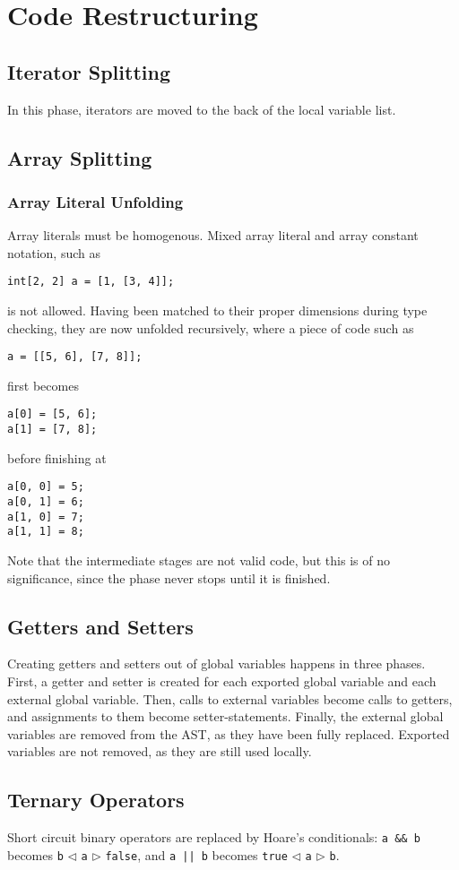 \documentclass[a4paper,11pt]{report}
\begin{document}
\section{Code Restructuring}
\subsection{Iterator Splitting}
In this phase, iterators are moved to the back of the local variable list.

\subsection{Array Splitting}
\subsubsection{Array Literal Unfolding}
Array literals must be homogenous. Mixed array literal and array constant notation, such as
\begin{verbatim}
int[2, 2] a = [1, [3, 4]];
\end{verbatim}
is not allowed. Having been matched to their proper dimensions during type checking, they are now unfolded recursively, where a piece of code such as
\begin{verbatim}
a = [[5, 6], [7, 8]];
\end{verbatim}
first becomes
\begin{verbatim}
a[0] = [5, 6];
a[1] = [7, 8];
\end{verbatim}
before finishing at
\begin{verbatim}
a[0, 0] = 5;
a[0, 1] = 6;
a[1, 0] = 7;
a[1, 1] = 8;
\end{verbatim}
Note that the intermediate stages are not valid code, but this is of no significance, since the phase never stops until it is finished.
\subsection{Getters and Setters}
Creating getters and setters out of global variables happens in three phases. First, a getter and setter is created for each exported global variable and each external global variable. Then, calls to external variables become calls to getters, and assignments to them become setter-statements. Finally, the external global variables are removed from the AST, as they have been fully replaced. Exported variables are not removed, as they are still used locally.
\subsection{Ternary Operators}
Short circuit binary operators are replaced by Hoare's conditionals: \texttt{a \&\& b} becomes \texttt{b} $\triangleleft$ \texttt{a} $\triangleright$ \texttt{false}, and \texttt{a || b} becomes \texttt{true} $\triangleleft$ \texttt{a} $\triangleright$ \texttt{b}.
\end{document}
